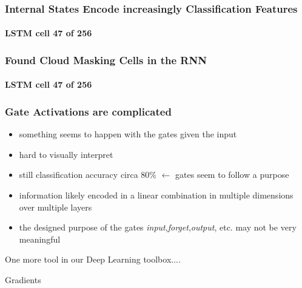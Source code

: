 
\begin{frame}
\frametitle{Internal States Encode increasingly Classification Features}
\framesubtitle{LSTM cell \textbf{47} of 256}
\end{frame}
%
\begin{frame}
\frametitle{Found Cloud Masking Cells in the RNN}
\framesubtitle{LSTM cell \textbf{47} of 256}
\end{frame}

\begin{frame}
\frametitle{Gate Activations are complicated}

\begin{itemize}
\item something seems to happen with the gates given the input
\item hard to visually interpret
\item still classification accuracy circa 80\% $\leftarrow$ gates seem to follow a purpose
\item information likely encoded in a linear combination in multiple dimensions over multiple layers
\item the designed purpose of the gates \emph{input},\emph{forget},\emph{output}, etc. may not be very meaningful
\end{itemize}
\end{frame}

{
\begin{frame}[plain]

\vspace{8em}
\begin{center}
\Huge\color{tumwhite}
One more tool in our Deep Learning toolbox....
\end{center}\color{white}

\end{frame}
}

{
\begin{frame}[plain]

\vspace{8em}
\begin{center}
\Huge\color{tumbluedark}
Gradients
\end{center}\color{white}

\end{frame}
}


